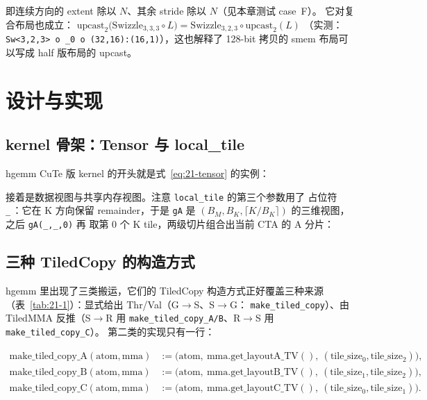 即连续方向的 extent 除以 $N$、其余 stride 除以 $N$（见本章测试 case~F）。
它对复合布局也成立：
$\mathrm{upcast}_2\bigl(\mathrm{Swizzle}_{3,3,3}\circ L\bigr) =
\mathrm{Swizzle}_{3,2,3}\circ \mathrm{upcast}_2(L)$
（实测：\texttt{Sw\allowbreak{}<3,\allowbreak{}2,\allowbreak{}3> o \_\allowbreak{}0 o \allowbreak{}(32,\allowbreak{}16):\allowbreak{}(16,\allowbreak{}1)}），这也解释了
128-bit 拷贝的 smem 布局可以写成 half 版布局的 upcast。

\section{设计与实现}

\subsection{kernel 骨架：Tensor 与 local\_tile}

hgemm CuTe 版 kernel 的开头就是式~\eqref{eq:21-tensor} 的实例：



接着是数据视图与共享内存视图。注意 \texttt{local\_tile} 的第三个参数用了
占位符 \texttt{\_}\,：它在 K 方向保留 remainder，于是 \texttt{gA} 是
$(B_M, B_K, \lceil K/B_K\rceil)$ 的三维视图，之后 \texttt{gA(\_,\_,0)} 再
取第 0 个 K tile，两级切片组合出当前 CTA 的 A 分片：



\subsection{三种 TiledCopy 的构造方式}

hgemm 里出现了三类搬运，它们的 TiledCopy 构造方式正好覆盖三种来源
（表~\ref{tab:21-1}）：显式给出 Thr/Val（G$\to$S、S$\to$G：
\texttt{make\_\allowbreak{}tiled\_\allowbreak{}copy}）、由 TiledMMA 反推（S$\to$R 用
\texttt{make\_\allowbreak{}tiled\_\allowbreak{}copy\_\allowbreak{}A/\allowbreak{}B}、R$\to$S 用 \texttt{make\_\allowbreak{}tiled\_\allowbreak{}copy\_\allowbreak{}C}）。
第二类的实现只有一行：

\begin{align}
  \mathrm{make\_tiled\_copy\_A}(\mathrm{atom}, \mathrm{mma}) &:=
    \bigl(\mathrm{atom},\ \mathrm{mma.get\_layoutA\_TV()},\
    (\mathrm{tile\_size}_0, \mathrm{tile\_size}_2)\bigr), \label{eq:21-mtca}\\
  \mathrm{make\_tiled\_copy\_B}(\mathrm{atom}, \mathrm{mma}) &:=
    \bigl(\mathrm{atom},\ \mathrm{mma.get\_layoutB\_TV()},\
    (\mathrm{tile\_size}_1, \mathrm{tile\_size}_2)\bigr), \label{eq:21-mtcb}\\
  \mathrm{make\_tiled\_copy\_C}(\mathrm{atom}, \mathrm{mma}) &:=
    \bigl(\mathrm{atom},\ \mathrm{mma.get\_layoutC\_TV()},\
    (\mathrm{tile\_size}_0, \mathrm{tile\_size}_1)\bigr). \label{eq:21-mtcc}
\end{align}

